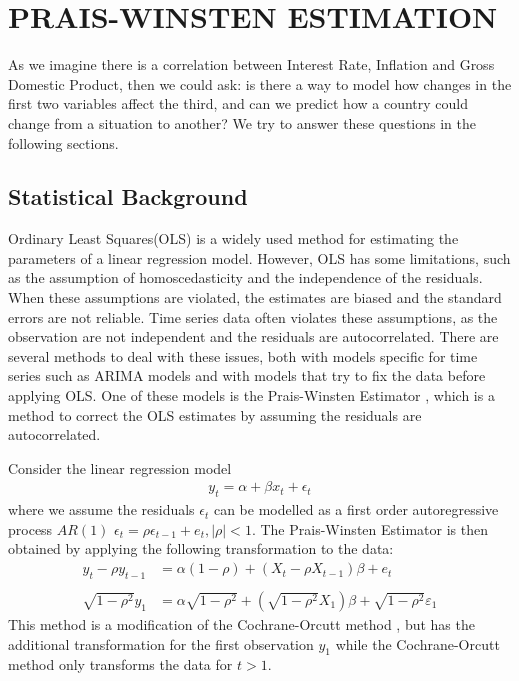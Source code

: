 \section{PRAIS-WINSTEN ESTIMATION}
\label{sec:regression}
As we imagine there is a correlation between Interest Rate, Inflation and Gross Domestic Product, then we could ask: is there a way to model how changes in the first two variables affect the third, and can we predict how a country could change from a situation to another? We try to answer these questions in the following sections.

\subsection*{Statistical Background}
Ordinary Least Squares(OLS) is a widely used method for estimating the parameters of a linear regression model. However, OLS has some limitations, such as the assumption of homoscedasticity and the independence of the residuals. When these assumptions are violated, the estimates are biased and the standard errors are not reliable. Time series data often violates these assumptions, as the observation are not independent and the residuals are autocorrelated. There are several methods to deal with these issues, both with models specific for time series such as ARIMA models and with models that try to fix the data before applying OLS. One of these models is the Prais-Winsten Estimator \cite{prais}, which is a method to correct the OLS estimates by assuming the residuals are autocorrelated.

Consider the linear regression model
\begin{align*}
  y_t = \alpha + \beta x_t + \epsilon_t
\end{align*}
where we assume the residuals $\epsilon_t$ can be modelled as a first order autoregressive process $AR(1)$ $\epsilon_t = \rho \epsilon_{t-1} + e_t, |\rho|<1$. The Prais-Winsten Estimator is then obtained by applying the following transformation to the data:
\begin{align*}
  y_{t}-\rho y_{t-1}         & =\alpha (1-\rho )+(X_{t}-\rho X_{t-1})\beta + e_{t}                                                               \\\\
  {\sqrt {1-\rho ^{2}}}y_{1} & =\alpha {\sqrt {1-\rho ^{2}}}+\left({\sqrt {1-\rho ^{2}}}X_{1}\right)\beta +{\sqrt {1-\rho ^{2}}}\varepsilon _{1}
\end{align*}
This method is a modification of the Cochrane-Orcutt method \cite{cochrane}, but has the additional transformation for the first observation $y_1$ while the Cochrane-Orcutt method only transforms the data for $t>1$.

